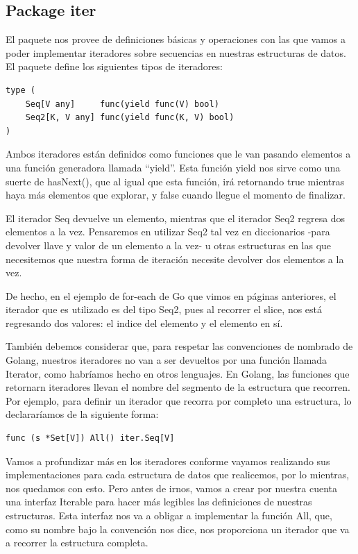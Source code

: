 \documentclass[11pt]{article}
\begin{document}
\subsection{Package iter}
\label{sec:org1073996}
El paquete nos provee de definiciones básicas y operaciones con las que vamos a poder implementar iteradores sobre secuencias en nuestras estructuras de datos. El paquete define los siguientes tipos de iteradores:

\begin{verbatim}
type (
	Seq[V any]     func(yield func(V) bool)
	Seq2[K, V any] func(yield func(K, V) bool)
)
\end{verbatim}

Ambos iteradores están definidos como funciones que le van pasando elementos a una función generadora llamada ``yield''. Esta función yield nos sirve como una suerte de hasNext(), que al igual que esta función, irá retornando true mientras haya más elementos que explorar, y false cuando llegue el momento de finalizar.

El iterador Seq devuelve un elemento, mientras que el iterador Seq2 regresa dos elementos a la vez. Pensaremos en utilizar Seq2 tal vez en diccionarios -para devolver llave y valor de un elemento a la vez- u otras estructuras en las que necesitemos que nuestra forma de iteración necesite devolver dos elementos a la vez.

De hecho, en el ejemplo de for-each de Go que vimos en páginas anteriores, el iterador que es utilizado es del tipo Seq2, pues al recorrer el slice, nos está regresando dos valores: el indice del elemento y el elemento en sí.

También debemos considerar que, para respetar las convenciones de nombrado de Golang, nuestros iteradores no van a ser devueltos por una función llamada Iterator, como habríamos hecho en otros lenguajes. En Golang, las funciones que retornarn iteradores llevan el nombre del segmento de la estructura que recorren. Por ejemplo, para definir un iterador que recorra por completo una estructura, lo declararíamos de la siguiente forma:

\begin{verbatim}
func (s *Set[V]) All() iter.Seq[V]
\end{verbatim}

Vamos a profundizar más en los iteradores conforme vayamos realizando sus implementaciones para cada estructura de datos que realicemos, por lo mientras, nos quedamos con esto. Pero antes de irnos, vamos a crear por nuestra cuenta una interfaz Iterable para hacer más legibles las definiciones de nuestras estructuras. Esta interfaz nos va a obligar a implementar la función All, que, como su nombre bajo la convención nos dice, nos proporciona un iterador que va a recorrer la estructura completa.
\end{document}
